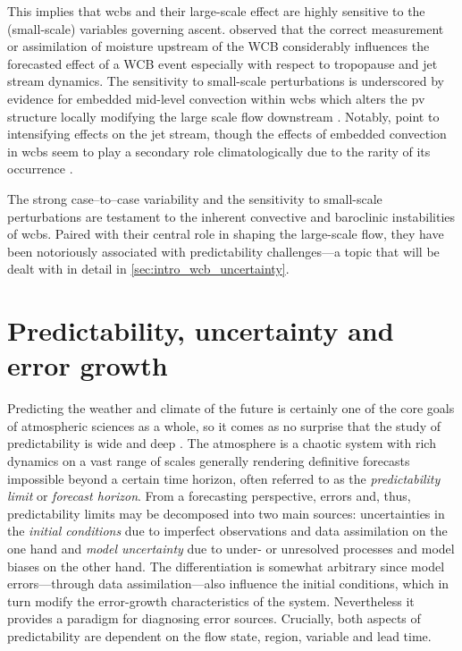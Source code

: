 This implies that \glspl{wcb} and their large-scale effect are highly sensitive
to the (small-scale) variables governing ascent.
\textcite{schaflerImpactInflowMoisture2015} observed that the correct
measurement or assimilation of moisture upstream of the WCB considerably
influences the forecasted effect of a WCB event especially with respect to
tropopause and jet stream dynamics. The sensitivity to small-scale
perturbations is underscored by evidence for embedded mid-level
convection within \glspl{wcb} which alters the \gls{pv} structure locally
modifying the large scale flow downstream
\parencite{oertelConvectiveActivityExtratropical2019,
    oertelPotentialVorticityStructure2020}. Notably,
\textcite{blanchardMidlevelConvectionWarm2021} point to intensifying effects on
the jet stream, though the effects of embedded convection in \glspl{wcb} seem
to play a secondary role climatologically due to the rarity of its occurrence
\parencite{oertelInteractionMicrophysicsDynamics2023}.

The strong case--to--case variability and the sensitivity to small-scale
perturbations are testament to the inherent convective and baroclinic
instabilities of \glspl{wcb}. Paired with their central role in shaping
the large-scale flow, they have been notoriously associated with predictability
challenges---a topic that will be dealt with in detail in
\cref{sec:intro_wcb_uncertainty}.

\section{Predictability, uncertainty and error growth}
\label{sec:intro_predictability}

Predicting the weather and climate of the future is certainly one of the core
goals of atmospheric sciences as a whole, so it comes as no surprise that the
study of predictability is wide and deep
\parencite{krishnamurthyPredictabilityWeatherClimate2019}.
The atmosphere is a chaotic system with rich dynamics on a vast range of
scales generally rendering definitive forecasts impossible beyond a certain
time horizon, often referred to as the \emph{predictability limit} or
\emph{forecast horizon}. From a forecasting perspective, errors and, thus,
predictability limits may be decomposed into two main sources:
uncertainties in the \emph{initial conditions} due to imperfect observations
and data assimilation on the one hand and \emph{model uncertainty} due to
under- or unresolved processes and model biases on the other hand.
The differentiation is somewhat arbitrary since model errors---through data
assimilation---also influence the initial conditions, which in turn modify the
error-growth characteristics of the system. Nevertheless it provides a
paradigm for diagnosing error sources. Crucially, both aspects of
predictability are dependent on the flow state, region, variable and lead time.

